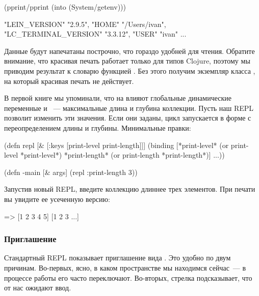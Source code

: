 \begin{english}
  \begin{clojure}
(pprint/pprint
  (into {} (System/getenv)))

{"LEIN_VERSION" "2.9.5",
 "HOME" "/Users/ivan",
 "LC_TERMINAL_VERSION" "3.3.12",
 "USER" "ivan"
 ...
 }
  \end{clojure}
\end{english}

Данные будут напечатаны построчно, что гораздо удобней для чтения. Обратите внимание, что красивая печать работает только для типов Clojure, поэтому мы приводим результат  к словарю функцией . Без этого получим экземпляр класса , на который красивая печать не действует.

В первой книге мы упоминали, что на  влияют глобальные динамические переменные  и ~--- максимальные длина и глубина коллекции. Пусть наш REPL позволит изменить эти значения. Если они заданы, цикл запускается в форме  с переопределением длины и глубины. Минимальные правки:

\begin{english}
  \begin{clojure}
(defn repl [& [{:keys [print-level
                       print-length]}]]
  (binding [*print-level*
            (or print-level *print-level*)
            *print-length*
            (or print-length *print-length*)]
    ...))

(defn -main [& args]
  (repl {:print-length 3}))
  \end{clojure}
\end{english}

Запустив новый REPL, введите коллекцию длиннее трех элементов. При печати вы увидите ее усеченную версию:

\begin{english}
  \begin{clojure}
=> [1 2 3 4 5]
[1 2 3 ...]
  \end{clojure}
\end{english}

\subsubsection{Приглашение}

Стандартный REPL показывает приглашение вида . Это удобно по двум причинам. Во-первых, ясно, в каком пространстве мы находимся сейчас~--- в процессе работы его часто переключают. Во-вторых, стрелка подсказывает, что от нас ожидают ввод.

